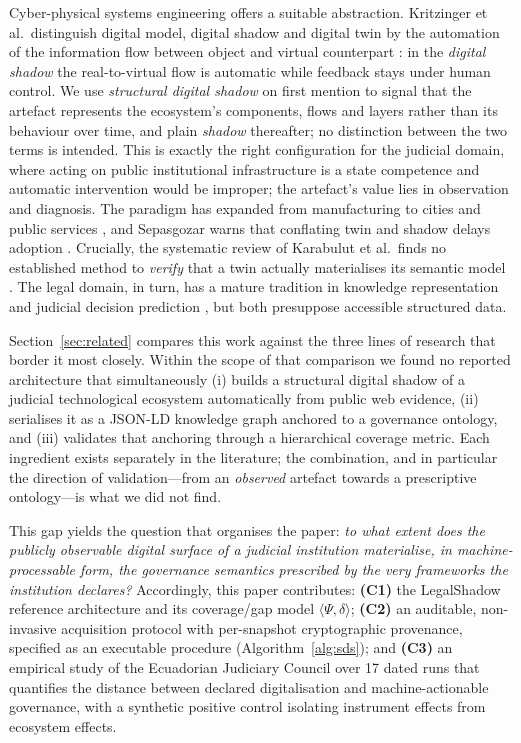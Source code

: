 \documentclass[engproc,proceedingpaper,submit,moreauthors]{Definitions/mdpi}
\begin{document}
    Cyber-physical systems engineering offers a suitable abstraction. Kritzinger et al.\ distinguish digital model, digital shadow and digital twin by the automation of the information flow between object and virtual counterpart \cite{Kritzinger2018}: in the \emph{digital shadow} the real-to-virtual flow is automatic while feedback stays under human control. We use \emph{structural digital shadow} on first mention to signal that the artefact represents the ecosystem's components, flows and layers rather than its behaviour over time, and plain \emph{shadow} thereafter; no distinction between the two terms is intended. This is exactly the right configuration for the judicial domain, where acting on public institutional infrastructure is a state competence and automatic intervention would be improper; the artefact's value lies in observation and diagnosis. The paradigm has expanded from manufacturing \cite{Tao2019} to cities and public services \cite{Shahat2021,Brauner2022}, and Sepasgozar warns that conflating twin and shadow delays adoption \cite{Sepasgozar2021}. Crucially, the systematic review of Karabulut et al.\ finds no established method to \emph{verify} that a twin actually materialises its semantic model \cite{Karabulut2024}. The legal domain, in turn, has a mature tradition in knowledge representation \cite{Casanovas2016} and judicial decision prediction \cite{Medvedeva2020}, but both presuppose accessible structured data.

    Section~\ref{sec:related} compares this work against the three lines of research that border it most closely. Within the scope of that comparison we found no reported architecture that simultaneously (i) builds a structural digital shadow of a judicial technological ecosystem automatically from public web evidence, (ii) serialises it as a JSON-LD knowledge graph anchored to a governance ontology, and (iii) validates that anchoring through a hierarchical coverage metric. Each ingredient exists separately in the literature; the combination, and in particular the direction of validation---from an \emph{observed} artefact towards a prescriptive ontology---is what we did not find.

    This gap yields the question that organises the paper: \emph{to what extent does the publicly observable digital surface of a judicial institution materialise, in machine-processable form, the governance semantics prescribed by the very frameworks the institution declares?} Accordingly, this paper contributes: \textbf{(C1)} the LegalShadow reference architecture and its coverage/gap model $\langle\Psi,\delta\rangle$; \textbf{(C2)} an auditable, non-invasive acquisition protocol with per-snapshot cryptographic provenance, specified as an executable procedure (Algorithm~\ref{alg:sds}); and \textbf{(C3)} an empirical study of the Ecuadorian Judiciary Council over 17 dated runs that quantifies the distance between declared digitalisation and machine-actionable governance, with a synthetic positive control isolating instrument effects from ecosystem effects.
\end{document}
